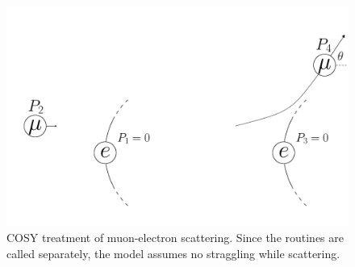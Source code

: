 \begin{figure}
  \centering
    \includegraphics[width=\textwidth]{Figures/MottScattering} 
  \caption{COSY treatment of muon-electron scattering. Since the routines are called separately, the model assumes no straggling while scattering.}
  \label{fig:mottScattering}
\end{figure}


